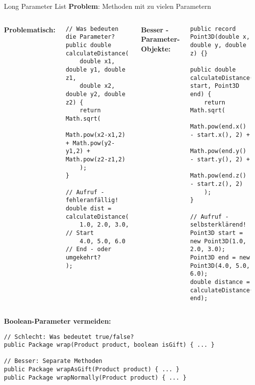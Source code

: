 \begin{frame}[fragile]{Long Parameter List}
  \textbf{Problem}: Methoden mit zu vielen Parametern

  \begin{columns}[T]
    \textbf{Problematisch:}
    \begin{lstlisting}[style=java, basicstyle=\tiny\ttfamily]
// Was bedeuten die Parameter?
public double calculateDistance(
    double x1, double y1, double z1,
    double x2, double y2, double z2) {
    return Math.sqrt(
        Math.pow(x2-x1,2) + Math.pow(y2-y1,2) + Math.pow(z2-z1,2)
    );
}

// Aufruf - fehleranfällig!
double dist = calculateDistance(
    1.0, 2.0, 3.0,    // Start
    4.0, 5.0, 6.0     // End - oder umgekehrt?
);
    \end{lstlisting}

    \textbf{Besser - Parameter-Objekte:}
    \begin{lstlisting}[style=java, basicstyle=\tiny\ttfamily]
public record Point3D(double x, double y, double z) {}

public double calculateDistance(Point3D start, Point3D end) {
    return Math.sqrt(
        Math.pow(end.x() - start.x(), 2) +
        Math.pow(end.y() - start.y(), 2) +
        Math.pow(end.z() - start.z(), 2)
    );
}

// Aufruf - selbsterklärend!
Point3D start = new Point3D(1.0, 2.0, 3.0);
Point3D end = new Point3D(4.0, 5.0, 6.0);
double distance = calculateDistance(start, end);
    \end{lstlisting}
  \end{columns}

  \textbf{Boolean-Parameter vermeiden:}
  \begin{lstlisting}[style=java, basicstyle=\tiny\ttfamily]
// Schlecht: Was bedeutet true/false?
public Package wrap(Product product, boolean isGift) { ... }

// Besser: Separate Methoden
public Package wrapAsGift(Product product) { ... }
public Package wrapNormally(Product product) { ... }
  \end{lstlisting}
\end{frame}


